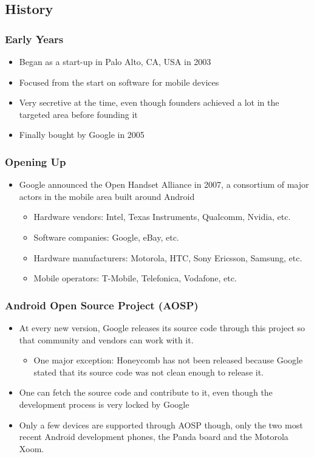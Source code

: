 \subsection{History}
\begin{frame}
  \frametitle{Early Years}
  \begin{itemize}
  \item Began as a start-up in Palo Alto, CA, USA in 2003
  \item Focused from the start on software for mobile devices
  \item Very secretive at the time, even though founders achieved a
    lot in the targeted area before founding it
  \item Finally bought by Google in 2005
  \end{itemize}
\end{frame}

\begin{frame}
  \frametitle{Opening Up}
  \begin{itemize}
  \item Google announced the Open Handset Alliance in 2007, a
    consortium of major actors in the mobile area built around Android
    \begin{itemize}
    \item Hardware vendors: Intel, Texas Instruments, Qualcomm,
      Nvidia, etc.
    \item Software companies: Google, eBay, etc.
    \item Hardware manufacturers: Motorola, HTC, Sony Ericsson,
      Samsung, etc.
    \item Mobile operators: T-Mobile, Telefonica, Vodafone, etc.
    \end{itemize}
  \end{itemize}
\end{frame}

\begin{frame}
  \frametitle{Android Open Source Project (AOSP)}
  \begin{itemize}
  \item At every new version, Google releases its source code
    through this project so that community and vendors can
    work with it.
    \begin{itemize}
    \item One major exception: Honeycomb has not been released because
      Google stated that its source code was not clean enough to
      release it.
    \end{itemize}
  \item One can fetch the source code and contribute to it, even though
    the development process is very locked by Google
  \item Only a few devices are supported through AOSP though, only the
    two most recent Android development phones, the Panda board and the
    Motorola Xoom.
  \end{itemize}
\end{frame}

